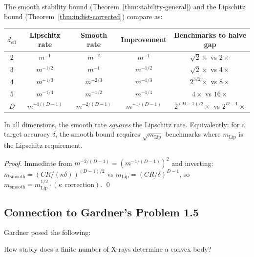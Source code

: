 \begin{corollary}
\label{cor:rates}
The smooth stability bound (Theorem~\ref{thm:stability-general}) and the Lipschitz bound (Theorem~\ref{thm:indist-corrected}) compare as:

\begin{center}
\renewcommand{\arraystretch}{1.3}
\begin{tabular}{ccccc}
\toprule
$d_{\mathrm{eff}}$ & \textbf{Lipschitz rate} & \textbf{Smooth rate} & \textbf{Improvement} & \textbf{Benchmarks to halve gap} \\
\midrule
2 & $m^{-1}$ & $m^{-2}$ & $m^{-1}$ & $\sqrt{2}\times$ vs $2\times$ \\
3 & $m^{-1/2}$ & $m^{-1}$ & $m^{-1/2}$ & $\sqrt{2}\times$ vs $4\times$ \\
4 & $m^{-1/3}$ & $m^{-2/3}$ & $m^{-1/3}$ & $2^{3/2}\times$ vs $8\times$ \\
5 & $m^{-1/4}$ & $m^{-1/2}$ & $m^{-1/4}$ & $4\times$ vs $16\times$ \\
$D$ & $m^{-1/(D-1)}$ & $m^{-2/(D-1)}$ & $m^{-1/(D-1)}$ & $2^{(D-1)/2}\times$ vs $2^{D-1}\times$ \\
\bottomrule
\end{tabular}
\end{center}

\noindent In all dimensions, the smooth rate \emph{squares} the Lipschitz rate. Equivalently: for a target accuracy $\delta$, the smooth bound requires $\sqrt{m_{\mathrm{Lip}}}$ benchmarks where $m_{\mathrm{Lip}}$ is the Lipschitz requirement.
\end{corollary}

\begin{proof}
Immediate from $m^{-2/(D-1)} = (m^{-1/(D-1)})^2$ and inverting: $m_{\mathrm{smooth}} = (CR/(\kappa\delta))^{(D-1)/2}$ vs $m_{\mathrm{Lip}} = (CR/\delta)^{D-1}$, so $m_{\mathrm{smooth}} = m_{\mathrm{Lip}}^{1/2} \cdot (\kappa \text{ correction})$. \qed
\end{proof}


\subsection{Connection to Gardner's Problem 1.5}

Gardner \cite{gardner1995geometric} posed the following:

\begin{problem}[Gardner 1.5]
How stably does a finite number of X-rays determine a convex body?
\end{problem}

